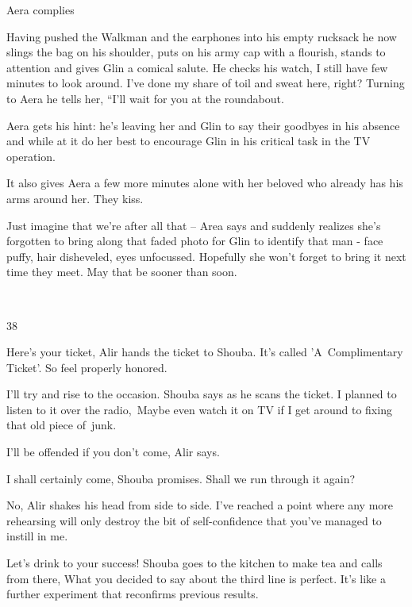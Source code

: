 \documentclass[letterpaper]{article}
\begin{document}
Aera complies

Having pushed the Walkman and the earphones into his empty rucksack he now slings the bag on his shoulder, puts on his
army cap with a flourish, stands to attention and gives Glin a comical salute. He checks his watch, {\textquotedbl}I
still have few minutes to look around. I've done my share of toil and sweat here, right?{\textquotedbl} Turning to Aera
he tells her, ``I'll wait for you at the roundabout.{\textquotedbl}

Aera gets his hint: he's leaving her and Glin to say their goodbyes in his absence and while at it do her best to
encourage Glin in his critical task in the TV operation.\ 

It also gives Aera a few more minutes alone with her beloved who already has his arms around her. They kiss. \ 

{\textquotedbl}Just imagine that we're after all that --{\textquotedbl} Area says and suddenly realizes she's forgotten
to bring along that faded photo for Glin to identify that man - face puffy, hair disheveled, eyes unfocussed. Hopefully
she won't forget to bring it next time they meet. May that be sooner than soon.

~

38 

{\textquotedbl}Here's your ticket,{\textquotedbl} Alir hands the ticket to Shouba. {\textquotedbl}It's called
'A\ Complimentary Ticket'. So feel properly honored.{\textquotedbl} 

{\textquotedbl}I'll try and rise to the occasion.{\textquotedbl} Shouba says as he scans the ticket. {\textquotedbl}I
planned to listen to it over the radio,\ Maybe even watch it on TV if I get around to fixing that old piece
of~junk.{\textquotedbl} 

{\textquotedbl}I'll be offended if you don't come,{\textquotedbl} Alir says. 

{\textquotedbl}I shall certainly come,{\textquotedbl} Shouba promises. {\textquotedbl}Shall we run through it
again?{\textquotedbl} 

{\textquotedbl}No,{\textquotedbl} Alir shakes his head from side to side. {\textquotedbl}I've reached a point where any
more rehearsing will only destroy the bit of self-confidence that you{}'ve managed to instill in me.{\textquotedbl} 

{\textquotedbl}Let's drink to your success!{\textquotedbl} Shouba goes to the kitchen to make tea and calls from there,
{\textquotedbl}What you decided to say about the third line is perfect. It's like a further experiment that reconfirms
previous results.{\textquotedbl} 
\end{document}
